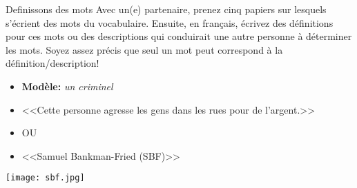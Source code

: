 \begin{frame}{Definissons des mots}
  Avec un(e) partenaire, prenez cinq papiers sur lesquels s'écrient des mots du vocabulaire.
  Ensuite, \alert{en français}, écrivez des définitions pour ces mots ou des descriptions qui conduirait une autre personne à déterminer les mots.
  Soyez assez précis que seul un mot peut correspond à la définition/description!
  \begin{itemize}
    \item[] \textbf{Modèle:} \emph{un criminel}
    \item {}<<Cette personne agresse les gens dans les rues pour de l'argent.>>
    \item[] OU
    \item {}<<Samuel Bankman-Fried (SBF)>>
  \end{itemize}
  \begin{flushright}
    \texttt{[image: sbf.jpg]}
  \end{flushright}
\end{frame}